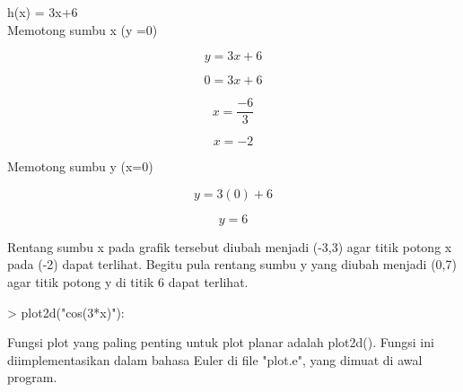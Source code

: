 \documentclass[a4paper,10pt]{article}
\begin{document}
\begin{eulernotebook}
\begin{eulercomment}
\begin{eulercomment}
\begin{eulercomment}
\begin{eulercomment}
\begin{eulercomment}
h(x) = 3x+6\\
Memotong sumbu x (y =0)\\
\end{eulercomment}
\begin{eulerformula}
\[
y = 3x+6
\]
\end{eulerformula}
\begin{eulerformula}
\[
0 = 3x+6
\]
\end{eulerformula}
\begin{eulerformula}
\[
x = \frac{-6}{3}
\]
\end{eulerformula}
\begin{eulerformula}
\[
x = -2
\]
\end{eulerformula}
\begin{eulercomment}
Memotong sumbu y (x=0)\\
\end{eulercomment}
\begin{eulerformula}
\[
y = 3(0)+6
\]
\end{eulerformula}
\begin{eulerformula}
\[
y = 6
\]
\end{eulerformula}
\begin{eulercomment}
Rentang sumbu x pada grafik tersebut diubah menjadi (-3,3) agar titik
potong x pada (-2) dapat terlihat. Begitu pula rentang sumbu y yang
diubah menjadi (0,7) agar titik potong y di titik 6 dapat terlihat.
\end{eulercomment}
\begin{eulerprompt}
> plot2d("cos(3*x)"):
\end{eulerprompt}
\begin{eulercomment}
Fungsi plot yang paling penting untuk plot planar adalah plot2d().
Fungsi ini diimplementasikan dalam bahasa Euler di file "plot.e", yang
dimuat di awal program.


\end{eulercomment}
\end{eulercomment}
\end{eulercomment}
\end{eulercomment}
\end{eulercomment}
\end{eulernotebook}
\end{document}
